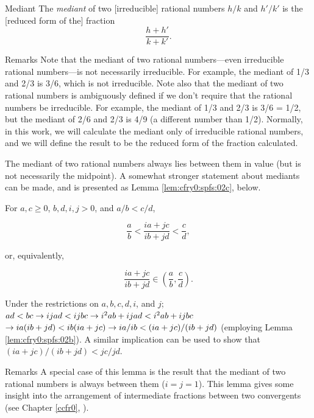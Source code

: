 \begin{vworkdefinitionstatementpar}{Mediant}
\label{def:cfry0:spfs:02}
The \emph{mediant} of two [irreducible] rational numbers
$h/k$ and $h'/k'$ is the [reduced form of the] fraction
\begin{equation}
\frac{h+h'}{k+k'} .
\end{equation}
\end{vworkdefinitionstatementpar}
\begin{vworkdefinitionparsection}{Remarks}
Note that the mediant of two rational numbers---even
irreducible rational numbers---is not necessarily irreducible.
For example, the mediant of 1/3 and 2/3 is 3/6, which is
not irreducible.  Note also that the mediant of two rational
numbers is ambiguously defined if we don't require that the 
rational numbers be irreducible.  For example, 
the mediant of 1/3 and 2/3 is 3/6 = 1/2, but the
mediant of 2/6 and 2/3 is 4/9 (a different number than
1/2).  Normally, in this work, we will calculate the mediant
only of irreducible rational numbers, and we will define
the result to be the reduced form of the fraction calculated.
\end{vworkdefinitionparsection}
\vworkdefinitionfooter{}

The mediant of two rational numbers always lies between them in value (but
is not necessarily the midpoint).  A somewhat stronger
statement about mediants can be made, and is 
presented as Lemma \ref{lem:cfry0:spfs:02c}, below.

\begin{vworklemmastatement}
\label{lem:cfry0:spfs:02c}
For 
$a,c \geq 0$,
$b,d,i,j > 0$, and
$a/b < c/d$,

\begin{equation}
\frac{a}{b} < \frac{ia + jc}{ib + jd} < \frac{c}{d} ,
\end{equation}

or, equivalently,

\begin{equation}
\frac{ia + jc}{ib + jd} \in \left( { \frac{a}{b} , \frac{c}{d} } \right) .
\end{equation}

\end{vworklemmastatement}
\begin{vworklemmaproof}
Under the restrictions on $a,b,c,d,i$, and $j$;
$ad < bc \to ijad < ijbc \to i^2ab+ijad < i^2ab + ijbc$
$\to ia(ib+jd) < ib(ia+jc) \to ia/ib < (ia+jc)/(ib+jd)$
(employing Lemma \ref{lem:cfry0:spfs:02b}).  A similar implication
can be used to show that $(ia+jc)/(ib+jd) < jc/jd$.
\end{vworklemmaproof}
\begin{vworklemmaparsection}{Remarks}
A special case of this lemma is the result that the mediant of two
rational numbers is always between them ($i=j=1$).  This lemma gives
some insight into the arrangement of 
intermediate fractions
between
two convergents
(see Chapter \ref{ccfr0}, 
\emph{\ccfrzeroshorttitle{}}).
\end{vworklemmaparsection}

